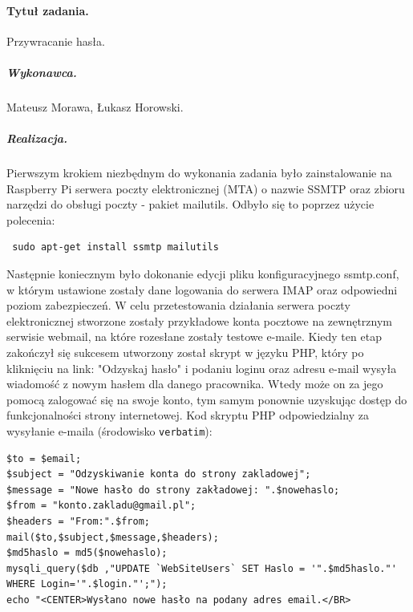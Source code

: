 \documentclass[a4paper]{article}
\begin{document}
\paragraph{Tytuł zadania.} Przywracanie hasła.
\subparagraph{Wykonawca.} Mateusz Morawa, Łukasz Horowski.
\subparagraph{Realizacja.} Pierwszym krokiem niezbędnym do wykonania zadania było zainstalowanie na Raspberry Pi serwera poczty elektronicznej (MTA) o nazwie SSMTP oraz zbioru narzędzi do obsługi poczty - pakiet mailutils. Odbyło się to poprzez użycie polecenia: 
\begin{verbatim} sudo apt-get install ssmtp mailutils\end{verbatim} 
Następnie koniecznym było dokonanie edycji pliku konfiguracyjnego ssmtp.conf, w którym ustawione zostały dane logowania do serwera IMAP oraz odpowiedni poziom zabezpieczeń. W celu przetestowania działania serwera poczty elektronicznej stworzone zostały przykładowe konta pocztowe na zewnętrznym serwisie webmail, na które rozesłane zostały testowe e-maile. Kiedy ten etap zakończył się sukcesem utworzony został skrypt w języku PHP, który po kliknięciu na link: "Odzyskaj hasło" i podaniu loginu oraz adresu e-mail wysyła wiadomość z nowym hasłem dla danego pracownika. Wtedy może on za jego pomocą zalogować się na swoje konto, tym samym ponownie uzyskując dostęp do funkcjonalności strony internetowej. Kod skryptu PHP odpowiedzialny za wysyłanie e-maila (środowisko \texttt{verbatim}):
\begin{verbatim}
$to = $email;
$subject = "Odzyskiwanie konta do strony zakladowej";
$message = "Nowe hasło do strony zakładowej: ".$nowehaslo;
$from = "konto.zakladu@gmail.pl";
$headers = "From:".$from;
mail($to,$subject,$message,$headers);
$md5haslo = md5($nowehaslo);
mysqli_query($db ,"UPDATE `WebSiteUsers` SET Haslo = '".$md5haslo."' 
WHERE Login='".$login."';");
echo "<CENTER>Wysłano nowe hasło na podany adres email.</BR>
\end{verbatim}
\end{document}

